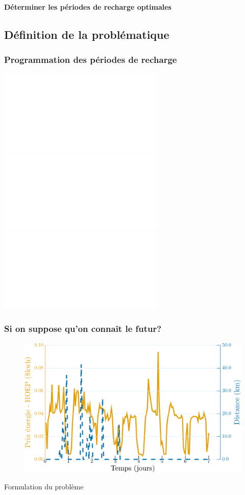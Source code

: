 \documentclass[french]{beamer}
\begin{document}
{\begin{frame}
\begin{center}
\huge \textbf{Déterminer les périodes de recharge optimales}
\end{center}
\end{frame}


\subsection{Définition de la problématique}


\begin{frame}
\begin{center}
\frametitle{Programmation des périodes de recharge}
\includegraphics<1>[width=0.9\linewidth]{obj01.pdf}
\includegraphics<2>[width=0.9\linewidth]{obj02.pdf}
\includegraphics<3>[width=0.9\linewidth]{obj03.pdf}
\end{center}
\end{frame}


\begin{frame}
\frametitle{Si on suppose qu'on connaît le futur?}
\begin{center}
\begin{figure}
\includegraphics[width=\linewidth]{PriceDist_201Fr.pdf}
\end{figure} 
 \end{center}
\end{frame}

\begin{frame}{Formulation du problème}


\end{frame}}
\end{document}
